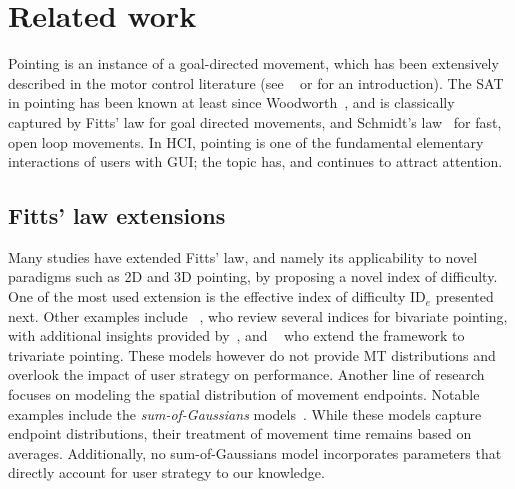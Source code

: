\documentclass[acmlarge, manuscript,review]{acmart}
\newcommand{\ide}{\ensuremath{{\text{ID}_e}}\xspace}
\begin{document}
\section{Related work\label{sec:rw}}
Pointing is an instance of a goal-directed movement, which has been extensively described in the motor control literature (see \eg~\cite[Section 2]{todorov1998} or \cite{elliott2017} for an introduction). The SAT in pointing has been known at least since Woodworth~\cite{woodworth1899}, and is classically captured by Fitts' law for goal directed movements, and Schmidt's law~\cite{schmidt1979} for fast, open loop movements.
In HCI, pointing is one of the fundamental elementary interactions of users with GUI; the topic has, and continues to attract attention.

\subsection{Fitts' law extensions}
Many studies have extended Fitts' law, and namely its applicability to novel paradigms such as 2D and 3D pointing, by proposing a novel index of difficulty. One of the most used extension is the effective index of difficulty \ide presented next.
Other examples include \citeauthor{accot2003}~\cite{accot2003}, who review several indices for bivariate pointing, with additional insights provided by~\cite{grossman2005b}, and \citeauthor{murata2001}~\cite{murata2001} who extend the framework to trivariate pointing.
These models however do not provide MT distributions and overlook the impact of user strategy on performance.
Another line of research focuses on modeling the spatial distribution of movement endpoints. Notable examples include the \textit{sum-of-Gaussians} models~\cite{bi2013, yamanaka2020, zhang2023}. While these models capture endpoint distributions, their treatment of movement time remains based on averages. Additionally, no sum-of-Gaussians model incorporates parameters that directly account for user strategy to our knowledge.

\end{document}
